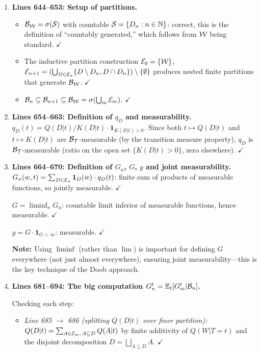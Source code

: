 \documentclass{article}
\begin{document}
\begin{enumerate}[leftmargin=*]
  \item \textbf{Lines 644--653: Setup of partitions.}
    \begin{itemize}
      \item $\mathcal{B}_{\mathcal{W}}=\sigma(\mathcal{S})$ with countable
            $\mathcal{S}=\{D_n:n\in\mathbb{N}\}$: correct, this is the definition of
            ``countably generated,'' which follows from $\mathcal{W}$ being standard.
            $\checkmark$
      \item The inductive partition construction $\mathcal{E}_0=\{\mathcal{W}\}$,
            $\mathcal{E}_{n+1} = (\bigcup_{D\in\mathcal{E}_n}\{D\setminus D_n, D\cap D_n\})
            \setminus\{\emptyset\}$ produces nested finite partitions that
            generate $\mathcal{B}_{\mathcal{W}}$.  $\checkmark$
      \item $\mathcal{B}_n \subseteq \mathcal{B}_{n+1} \subseteq \mathcal{B}_{\mathcal{W}} =
            \sigma(\bigcup_m\mathcal{E}_m)$.  $\checkmark$
    \end{itemize}

  \item \textbf{Lines 654--663: Definition of $q_D$ and measurability.}
    $q_D(t) = Q(D|t)/K(D|t)\cdot\mathbf{1}_{K(D|t)>0}$.
    Since both $t\mapsto Q(D|t)$ and $t\mapsto K(D|t)$ are
    $\mathcal{B}_{\mathcal{T}}$-measurable (by the transition measure property),
    $q_D$ is $\mathcal{B}_{\mathcal{T}}$-measurable (ratio on the open set $\{K(D|t)>0\}$,
    zero elsewhere).  $\checkmark$

  \item \textbf{Lines 664--670: Definition of $G_n$, $G$, $g$ and joint measurability.}
    $G_n(w,t) = \sum_{D\in\mathcal{E}_n}\mathbf{1}_D(w)\cdot q_D(t)$: finite sum
    of products of measurable functions, so jointly measurable.  $\checkmark$

    $G = \liminf_n G_n$: countable limit inferior of measurable functions,
    hence measurable.  $\checkmark$

    $g = G\cdot\mathbf{1}_{G<\infty}$: measurable.  $\checkmark$

    \textbf{Note:} Using $\liminf$ (rather than $\lim$) is important for
    defining $G$ everywhere (not just almost everywhere), ensuring joint
    measurability---this is the key technique of the Doob approach.

  \item \textbf{Lines 681--694: The big computation $G_n^t = \mathbb{E}_t[G_m^t|\mathcal{B}_n]$.}

    Checking each step:
    \begin{itemize}
      \item \emph{Line 685 $\to$ 686 (splitting $Q(D|t)$ over finer partition):}
        $Q(D|t) = \sum_{A\in\mathcal{E}_m,\,A\subseteq D} Q(A|t)$ by finite additivity
        of $Q(W|T=t)$ and the disjoint decomposition
        $D = \bigsqcup_{A\subseteq D} A$.  $\checkmark$


\end{itemize}
\end{enumerate}
\end{document}

